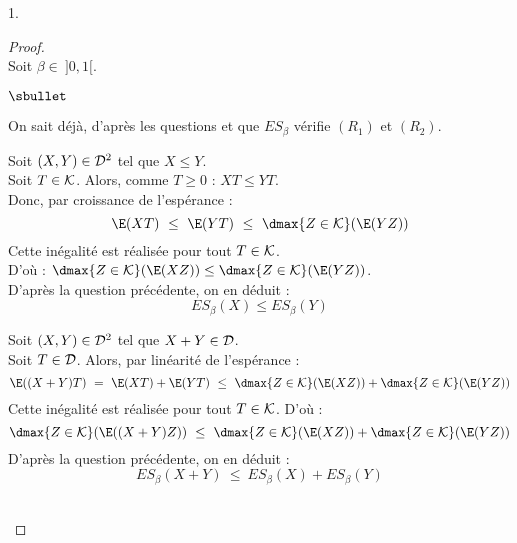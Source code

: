 \begin{noliste}{1.}
  \begin{proof}~\\
    Soit $\beta \in \ ]0,1[$.
    \begin{noliste}{$\sbullet$}
      \item On sait déjà, d'après les questions  et 
       que $ES_\beta$ vérifie $(R_1)$ et $(R_2)$.
      
      \item Soit $(X,Y) \in {\cal D}^2$ tel que $X \leq Y$.\\
      Soit $T \in {\cal K}$. Alors, comme $T\geq 0$ : $XT \leq YT$.\\
      Donc, par croissance de l'espérance :
      \[
        \E(XT) \ \leq \ \E(YT) \ \leq \ \dmax{Z\in {\cal K}}
        (\E(YZ))
      \]
      Cette inégalité est réalisée pour tout $T\in {\cal K}$.\\
      D'où : $\dmax{Z\in {\cal K}}(\E(XZ)) \leq \dmax{Z\in {\cal K}}
      (\E(YZ))$.\\
      D'après la question précédente, on en déduit :
      \[
        ES_\beta(X) \leq ES_\beta(Y)
      \]
      
      \item Soit $(X,Y) \in {\cal D}^2$ tel que $X +Y\in {\cal D}$.\\
      Soit $T \in {\cal D}$. Alors, par linéarité de l'espérance :
      \[
        \E((X+Y)T) \ = \ \E(XT) + \E(YT) \ \leq \ \dmax{Z\in {\cal K}}
        (\E(XZ)) + \dmax{Z\in {\cal K}} (\E(YZ))
      \]
      Cette inégalité est réalisée pour tout $T\in {\cal K}$.
      D'où : 
      \[
	\dmax{Z\in {\cal K}}(\E((X+Y)Z)) \ 
	\leq \ \dmax{Z\in {\cal K}}(\E(XZ)) +
        \dmax{Z\in {\cal K}}(\E(YZ))
      \]
      D'après la question précédente, on en déduit :
      \[
        ES_\beta(X+Y) \ \leq \ ES_\beta(X) + ES_\beta(Y)
      \]
    \end{noliste}
    ~\\[-1cm]
  \end{proof}
\end{noliste}

